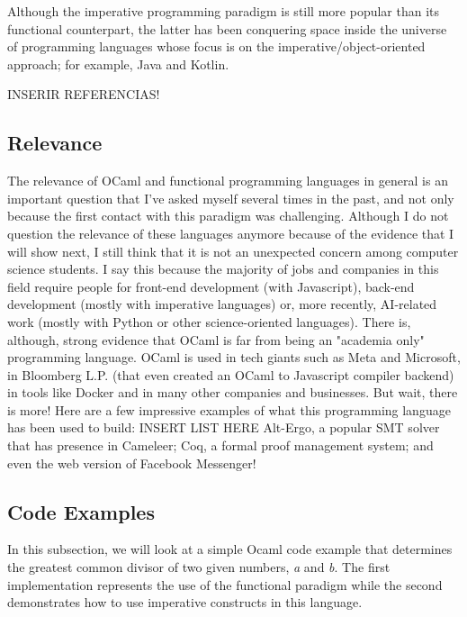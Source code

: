 Although the imperative programming paradigm is still more popular than its functional counterpart, the latter has been conquering space inside the universe of programming languages whose focus is on the imperative/object-oriented approach; for example, Java and Kotlin.

INSERIR REFERENCIAS!

\subsection{Relevance} 
\label{sub:relevance}

The relevance of OCaml and functional programming languages in general is an important question that I've asked myself several times in the past, and not only because the first contact with this paradigm was challenging.
Although I do not question the relevance of these languages anymore because of the evidence that I will show next, I still think that it is not an unexpected concern among computer science students.
I say this because the majority of jobs and companies in this field require people for front-end development (with Javascript), back-end development (mostly with imperative languages) or, more recently, AI-related work (mostly with Python or other science-oriented languages).
There is, although, strong evidence that OCaml is far from being an "academia only" programming language.
OCaml is used in tech giants such as Meta and Microsoft, in Bloomberg L.P. (that even created an OCaml to Javascript compiler backend) in tools like Docker and in many other companies and businesses.
But wait, there is more! Here are a few impressive examples of what this programming language has been used to build: INSERT LIST HERE
Alt-Ergo, a popular SMT solver that has presence in Cameleer;
Coq, a formal proof management system;
and even the web version of Facebook Messenger!

\subsection{Code Examples} 
\label{sub:examples_ocaml}

In this subsection, we will look at a simple Ocaml code example that determines the greatest common divisor of two given numbers, \emph{a} and \emph{b}.
The first implementation represents the use of the functional paradigm while the second demonstrates how to use imperative constructs in this language.

